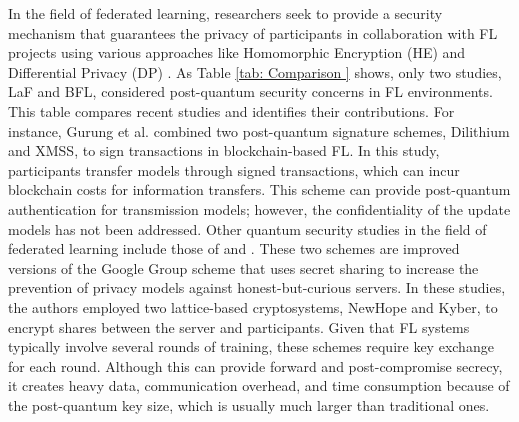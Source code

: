 \documentclass[a4paper,fleqn]{cas-dc}
\begin{document}
 In the field of federated learning, researchers seek to provide a security mechanism that guarantees the privacy of participants in collaboration with FL projects using various approaches like Homomorphic Encryption (HE) and Differential Privacy (DP) \citep{A_survey_on_security}. 
 As Table \ref{tab: Comparison } shows, only two studies, LaF \citep{Performance_Analysis} and BFL\citep{LaF}, considered post-quantum security concerns in FL environments.  
 This table compares recent studies and identifies their contributions. 
 For instance, Gurung et al. \citep{Performance_Analysis} combined two post-quantum signature schemes, Dilithium and XMSS, to sign transactions in blockchain-based FL.  
 In this study, participants transfer models through signed transactions, which can incur blockchain costs for information transfers.  
 This scheme can provide post-quantum authentication for transmission models; however, the confidentiality of the update models has not been addressed.   Other quantum security studies in the field of federated learning include those of \citep{LaF} and \citep{A_post-quantum_secure}.   
 These two schemes are improved versions of the Google Group scheme \citep{Practical_secure_aggregation} that uses secret sharing to increase the prevention of privacy models against honest-but-curious servers. 
 In these studies, the authors employed two lattice-based cryptosystems, NewHope \citep{NewHope} and Kyber, to encrypt shares between the server and participants. 
 Given that FL systems typically involve several rounds of training, these schemes require key exchange for each round.   
 Although this can provide forward and post-compromise secrecy, it creates heavy data, communication overhead, and time consumption because of the post-quantum key size, which is usually much larger than traditional ones.
\end{document}
